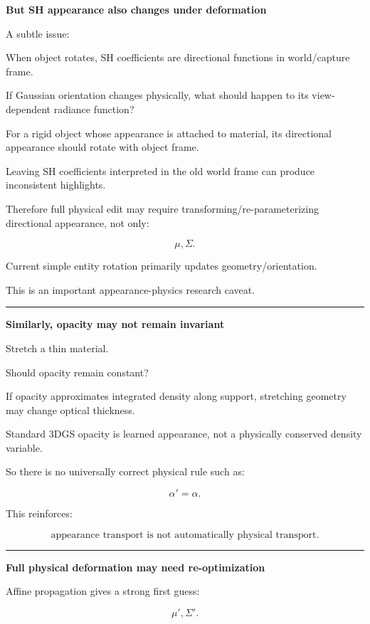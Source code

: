 \textbf{But SH appearance also changes under deformation}

A subtle issue:

When object rotates, SH coefficients are directional functions in world/capture frame.

If Gaussian orientation changes physically, what should happen to its view-dependent radiance function?

For a rigid object whose appearance is attached to material, its directional appearance should rotate with object frame.

Leaving SH coefficients interpreted in the old world frame can produce inconsistent highlights.

Therefore full physical edit may require transforming/re-parameterizing directional appearance, not only:

\[
\mu,\Sigma.
\]

Current simple entity rotation primarily updates geometry/orientation.

This is an important appearance-physics research caveat.

\begin{center}\rule{0.5\linewidth}{0.5pt}\end{center}

\textbf{Similarly, opacity may not remain invariant}

Stretch a thin material.

Should opacity remain constant?

If opacity approximates integrated density along support, stretching geometry may change optical thickness.

Standard 3DGS opacity is learned appearance, not a physically conserved density variable.

So there is no universally correct physical rule such as:

\[
\alpha'=\alpha.
\]

This reinforces:

\[
\boxed{
\text{appearance transport is not automatically physical transport}.
}
\]

\begin{center}\rule{0.5\linewidth}{0.5pt}\end{center}

\textbf{Full physical deformation may need re-optimization}

Affine propagation gives a strong first guess:

\[
\mu'\!,
\Sigma'\!.
\]

